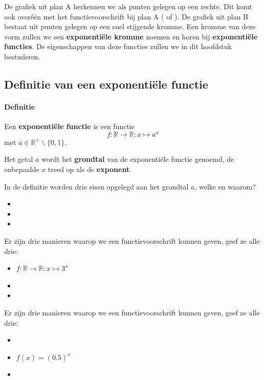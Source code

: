 \documentclass[12pt,twoside]{article}
\begin{document}
De grafiek uit plan A herkennen we als punten gelegen op een rechte. Dit komt ook overéén met het functievoorschrift bij plan A (\arule{5cm} of \arule{5cm}). De grafiek uit plan B bestaat uit punten gelegen op een snel stijgende kromme. Een kromme van deze vorm zullen we een {\bf exponentiële kromme} noemen en horen bij {\bf exponentiële functies}. De eigenschappen van deze functies zullen we in dit hoofdstuk bestuderen.

\subsection{Definitie van een exponentiële functie}

\paragraph*{Definitie}
\begin{mdframed}
Een {\bf exponentiële functie} is een functie
$$f:\mathbb{R}\to\mathbb{R}: x\mapsto a^x$$
met $a\in\mathbb{R}^+\backslash\{0,1\}$.
\end{mdframed}

Het getal $a$ wordt het {\bf grondtal} van de exponentiële functie genoemd, de onbepaalde $x$ treed op als de {\bf exponent}.

\begin{oefening}
In de definitie worden drie eisen opgelegd aan het grondtal $a$, welke en waarom?
\begin{itemize}
  \item \arulefill{}
  \item \arulefill{}
  \item \arulefill{}
\end{itemize}
\end{oefening}

\begin{oefening}
Er zijn drie manieren waarop we een functievoorschrift kunnen geven, geef ze alle drie:
\begin{itemize}
  \itemsep1em
  \item $f:\mathbb{R}\to\mathbb{R}: x\mapsto 3^x$
  \item \arulefill
  \item \arulefill
\end{itemize}
\end{oefening}

\begin{oefening}
Er zijn drie manieren waarop we een functievoorschrift kunnen geven, geef ze alle drie:
\begin{itemize}
  \itemsep1em
  \item \arulefill
  \item $f(x)=(0.5)^x$
  \item \arulefill
\end{itemize}
\end{oefening}
\end{document}
